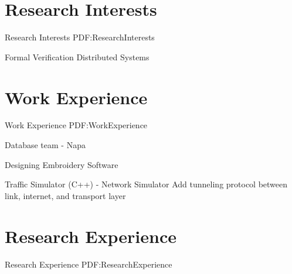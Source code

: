 \documentclass[a4paper,9pt,oneside]{article}
\begin{document}
\begin{body}

\section
{Research Interests}
{Research Interests}
{PDF:ResearchInterests}

\BulletItem
Formal Verification
\BulletItem
Distributed Systems


\section
{Work\newline
Experience}
{Work Experience}
{PDF:WorkExperience}


\GapNoBreak
\SubBulletItem
Database team - Napa


\GapNoBreak
\SubBulletItem
Designing Embroidery Software



\GapNoBreak
\SubBulletItem
Traffic Simulator (C++) - Network Simulator
\SubBulletItem
Add tunneling protocol between link, internet, and transport layer


\section
{Research Experience}
{Research Experience}
{PDF:ResearchExperience}


\end{body}
\end{document}
